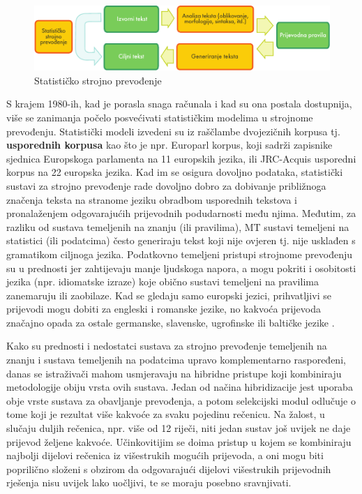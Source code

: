 \begin{multicols}{2}
\begin{figure}[htb]
  \center
  \includegraphics[width=\textwidth]{../_media/croatian/machine_translation}
  \caption{Statističko strojno prevođenje}
  \label{fig:mtarch_cro}
\end{figure}

S krajem 1980-ih, kad je porasla snaga računala i kad su ona postala dostupnija, više se zanimanja počelo posvećivati statističkim modelima u strojnome prevođenju. Statistički modeli izvedeni su iz raščlambe dvojezičnih korpusa tj. \textbf{usporednih korpusa} kao što je npr. Europarl korpus, koji sadrži zapisnike sjednica Europskoga parlamenta na 11 europskih jezika, ili JRC-Acquis usporedni korpus \cite{pro6} na 22 europska jezika. Kad im se osigura dovoljno podataka, statistički sustavi za strojno prevođenje rade dovoljno dobro za dobivanje približnoga značenja teksta na stranome jeziku obradbom usporednih tekstova i pronalaženjem odgovarajućih prijevodnih podudarnosti među njima. Međutim, za razliku od sustava temeljenih na znanju (ili pravilima), MT sustavi temeljeni na statistici (ili podatcima) često generiraju tekst koji nije ovjeren tj. nije usklađen s gramatikom ciljnoga jezika. Podatkovno temeljeni pristupi strojnome prevođenju su u prednosti jer zahtijevaju manje ljudskoga napora, a mogu pokriti i osobitosti jezika (npr. idiomatske izraze) koje obično sustavi temeljeni na pravilima zanemaruju ili zaobilaze. Kad se gledaju samo europski jezici, prihvatljivi se prijevodi mogu dobiti za engleski i romanske jezike, no kakvoća prijevoda značajno opada za ostale germanske, slavenske, ugrofinske ili baltičke jezike \cite{pro2}.

 
Kako su prednosti i nedostatci sustava za strojno prevođenje temeljenih na znanju i sustava temeljenih na podatcima upravo komplementarno raspoređeni, danas se istraživači mahom usmjeravaju na hibridne pristupe koji kombiniraju metodologije obiju vrsta ovih sustava. Jedan od načina hibridizacije jest uporaba obje vrste sustava za obavljanje prevođenja, a potom selekcijski modul odlučuje o tome koji je rezultat više kakvoće za svaku pojedinu rečenicu. Na žalost, u slučaju duljih rečenica, npr. više od 12 riječi, niti jedan sustav još uvijek ne daje prijevod željene kakvoće. Učinkovitijim se doima pristup u kojem se kombiniraju najbolji dijelovi rečenica iz višestrukih mogućih prijevoda, a oni mogu biti poprilično složeni s obzirom da odgovarajući dijelovi višestrukih prijevodnih rješenja nisu uvijek lako uočljivi, te se moraju posebno sravnjivati. 


\end{multicols}
